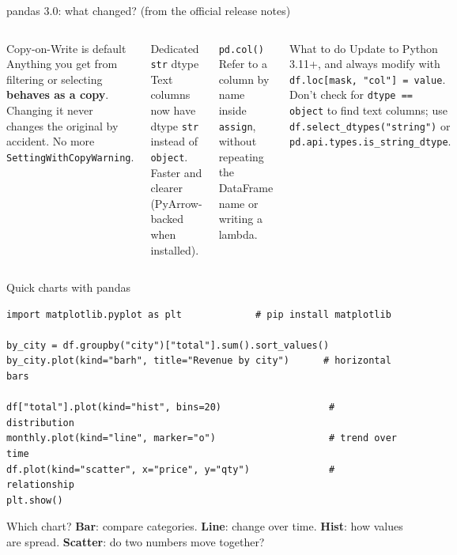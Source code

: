 \documentclass[aspectratio=169,10pt]{beamer}
\newcommand{\code}[1]{\texttt{#1}}
\begin{document}
\begin{frame}{pandas 3.0: what changed? (from the official release notes)}
  \begin{columns}[T]
    \begin{block}{Copy-on-Write is default}
      Anything you get from filtering or selecting \textbf{behaves as a copy}. Changing it
      never changes the original by accident. No more \code{SettingWithCopyWarning}.
    \end{block}
    \begin{block}{Dedicated \code{str} dtype}
      Text columns now have dtype \code{str} instead of \code{object}. Faster and clearer
      (PyArrow-backed when installed).
    \end{block}
    \begin{block}{\code{pd.col()}}
      Refer to a column by name inside \code{assign}, without repeating the DataFrame
      name or writing a lambda.
    \end{block}
    \begin{alertblock}{What to do}
      Update to Python 3.11+, and always modify with \code{df.loc[mask, "col"] = value}.
      Don't check for \code{dtype == object} to find text columns; use
      \code{df.select\_dtypes("string")} or \code{pd.api.types.is\_string\_dtype}.
    \end{alertblock}
  \end{columns}
\end{frame}

\begin{frame}[fragile]{Quick charts with pandas}
\begin{lstlisting}
import matplotlib.pyplot as plt             # pip install matplotlib

by_city = df.groupby("city")["total"].sum().sort_values()
by_city.plot(kind="barh", title="Revenue by city")      # horizontal bars

df["total"].plot(kind="hist", bins=20)                   # distribution
monthly.plot(kind="line", marker="o")                    # trend over time
df.plot(kind="scatter", x="price", y="qty")              # relationship
plt.show()
\end{lstlisting}
  \begin{block}{Which chart?}
    \textbf{Bar}: compare categories. \textbf{Line}: change over time. \textbf{Hist}: how
    values are spread. \textbf{Scatter}: do two numbers move together?
  \end{block}
\end{frame}
\end{document}
